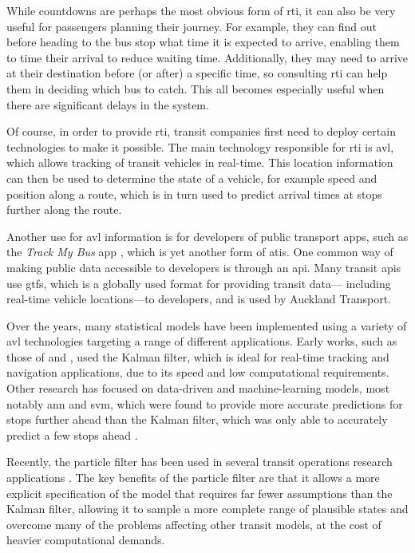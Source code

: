 \documentclass[12pt,a4paper]{article}
\newcommand{\kf}{Kalman filter}
\newcommand{\pf}{particle filter}
\begin{document}
While countdowns are perhaps the most obvious form of \gls{rti},
it can also be very useful for passengers planning their journey.
For example, they can find out before heading to the bus stop what time it is expected to arrive,
enabling them to time their arrival to reduce waiting time.
Additionally, they may need to arrive at their destination before (or after) a specific time,
so consulting \gls{rti} can help them in deciding which bus to catch.
This all becomes especially useful when there are significant delays in the system.


Of course, in order to provide \gls{rti},
transit companies first need to deploy certain technologies to make it possible.
The main technology responsible for \gls{rti} is \gls{avl},
which allows tracking of transit vehicles in real-time.
This location information can then be used to determine the state of a vehicle,
for example speed and position along a route,
which is in turn used to predict arrival times at stops further along the route.


Another use for \gls{avl} information is for developers of public transport apps,
such as the \emph{Track My Bus} app \citep{trackmybus},
which is yet another form of \gls{atis}.
One common way of making public data accessible to developers is through an \gls{api}.
Many transit \glspl{api} use \gls{gtfs}, 
which is a globally used format for providing transit data---%
including real-time vehicle locations---to developers,
and is used by Auckland Transport.


Over the years, many statistical models have been implemented using a variety of \gls{avl} technologies
targeting a range of different applications.
Early works, such as those of \cite{wall-dailey:1999} and \cite{dailey:2001},
used the \kf{}, which is ideal for real-time tracking and navigation applications,
due to its speed and low computational requirements.
Other research has focused on data-driven and machine-learning models,
most notably \gls{ann} and \gls{svm},
which were found to provide more accurate predictions for stops further ahead
than the \kf{}, which was only able to accurately predict a few stops ahead
\citep{chang-etal:2010}.


Recently, the \pf{} has been used in several transit operations research applications
\citep{chen-rakha:2014,hans-etal:2015}.
The key benefits of the \pf{} are that it allows a more explicit specification of the model
that requires far fewer assumptions than the \kf{},
allowing it to sample a more complete range of plausible states and
overcome many of the problems affecting other transit models,
at the cost of heavier computational demands.
\end{document}
